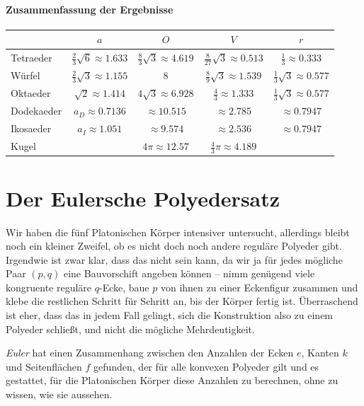 \documentclass[11pt]{article}
\begin{document}
\paragraph{Zusammenfassung der Ergebnisse}
\begin{center}
  \begin{tabular}{|l|c|c|c|c|}\hline
    & $a$ & $O$ & $V$ & $r$ \\\hline
    Tetraeder & $\frac23\sqrt{6}\approx 1.633$ & $\frac83\sqrt{3} \approx
    4.619$ & $\frac{8}{27}\sqrt{3} \approx 0.513$ & $\frac13 \approx 0.333$\\ 
    Würfel & $\frac23\sqrt{3}\approx 1.155$ & $8$ & $\frac{8}{9}\sqrt{3}
    \approx 1.539$ & $\frac13\sqrt{3} \approx 0.577$ \\
    Oktaeder & $\sqrt{2}\approx 1.414$ & $4\sqrt{3}\approx 6.928$ &
    $\frac43 \approx 1.333$ & $\frac13\sqrt{3} \approx 0.577$ \\
    Dodekaeder & $a_D\approx 0.7136$ & $\approx 10.515$ & $\approx 2.785$ &
    $\approx 0.7947$ \\ 
    Ikosaeder & $a_I\approx 1.051$ & $\approx 9.574$ & $ \approx 2.536$ &
    $\approx 0.7947$ \\
    Kugel &  & $4\pi\approx 12.57$ & $ \frac43\pi \approx 4.189$ & \\\hline 
  \end{tabular}
\end{center}

\section*{Der Eulersche Polyedersatz}

Wir haben die fünf Platonischen Körper intensiver untersucht, allerdings
bleibt noch ein kleiner Zweifel, ob es nicht doch noch andere reguläre
Polyeder gibt.  Irgendwie ist zwar klar, dass das nicht sein kann, da wir ja
für jedes mögliche Paar $(p,q)$ eine Bauvorschift angeben können -- nimm
genügend viele kongruente reguläre $q$-Ecke, baue $p$ von ihnen zu einer
Eckenfigur zusammen und klebe die restlichen Schritt für Schritt an, bis der
Körper fertig ist.  Überraschend ist eher, dass das in jedem Fall gelingt,
sich die Konstruktion also zu einem Polyeder schließt, und nicht die mögliche
Mehrdeutigkeit. 

\emph{Euler} hat einen Zusammenhang zwischen den Anzahlen der Ecken $e$,
Kanten $k$ und Seitenflächen $f$ gefunden, der für alle konvexen Polyeder gilt
und es gestattet, für die Platonischen Körper diese Anzahlen zu berechnen,
ohne zu wissen, wie sie aussehen.
\end{document}
